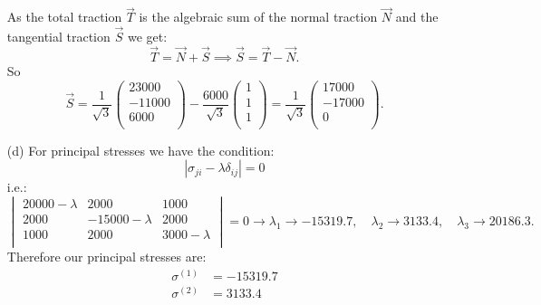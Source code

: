 \begin{derivation}
\begin{enumerate}[label=(\alph*)]
      As the total traction $\Vec{T}$ is the algebraic sum of the normal traction $\Vec{N}$ and the tangential traction $\Vec{S}$ we get:
      \begin{equation*}
        \Vec{T} = \Vec{N} + \Vec{S} \implies \Vec{S} = \Vec{T} - \Vec{N}
      .\end{equation*}
      So
      \begin{equation*}
        \Vec{S} = \frac{1}{\sqrt{3}} \begin{pmatrix}
          \num{23000} \\
        \num{-11000} \\
        \num{6000} \\
        \end{pmatrix} - \frac{\num{6000} }{\sqrt{3}} \begin{pmatrix}
          1\\
        1\\
        1\\
        \end{pmatrix} = \frac{1}{\sqrt{3}} \begin{pmatrix}
          \num{17000} \\
        \num{-17000} \\
        0\\
        \end{pmatrix}
      .\end{equation*}
    \item[(d)] For principal stresses we have the condition:
      \begin{equation*}
        \left| \sigma_{ji} - \lambda \delta_{ij} \right| = 0
      \end{equation*}
      i.e.:
      \begin{equation*}
        \begin{vmatrix} \num{20000} - \lambda & \num{2000}  & \num{1000} \\ \num{2000}  & -\num{15000} - \lambda & \num{2000} \\ \num{1000}  & \num{2000}  & \num{3000} - \lambda\\ \end{vmatrix} = 0 \rightarrow \lambda_1\to \num{-15319.7}, \quad \lambda_2\to \num{3133.4}, \quad \lambda_3\to \num{20186.3}
      .\end{equation*}
      Therefore our principal stresses are:
      \begin{align*}
        \sigma^{(1)} &= \num{-15319,7}  \\
        \sigma^{(2)} &= \num{3133,4}  \\

\end{align*}
\end{enumerate}
\end{derivation}
